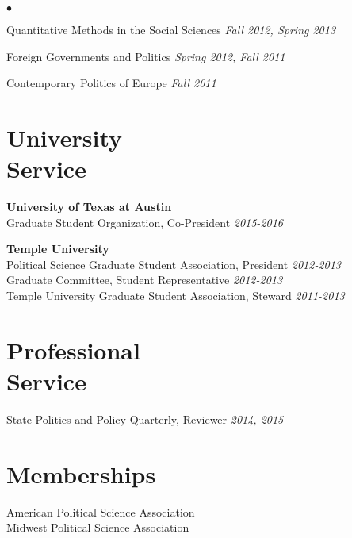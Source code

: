 \documentclass[margin,line]{res}
\newenvironment{list2}{
    \begin{list}{$\bullet$}{%
        \setlength{\itemsep}{0in}
        \setlength{\parsep}{0in} \setlength{\parskip}{0in}
        \setlength{\topsep}{0in} \setlength{\partopsep}{0in}
        \setlength{\leftmargin}{0.2in}}}{\end{list}}
\begin{document}
\begin{resume}
\begin{list2}
	\item Quantitative Methods in the Social Sciences \hfill {\em Fall 2012, Spring 2013}
	\item Foreign Governments and Politics \hfill {\em Spring 2012, Fall 2011}
	\item Contemporary Politics of Europe \hfill {\em Fall 2011}
\end{list2}




\section{\sc University \\Service}
{\bf University of Texas at Austin} \\
Graduate Student Organization, Co-President \hfill     {\em 2015-2016} %

{\bf Temple University}\\
Political Science Graduate Student Association, President \hfill {\em 2012-2013} \\
Graduate Committee, Student Representative \hfill {\em 2012-2013} \\
Temple University Graduate Student Association, Steward \hfill {\em 2011-2013} %

\section{\sc Professional \\Service}
State Politics and Policy Quarterly, Reviewer \hfill    {\em 2014, 2015} \\

\section{\sc Memberships}
American Political Science Association \\
Midwest Political Science Association \\



\end{resume}
\end{document}
